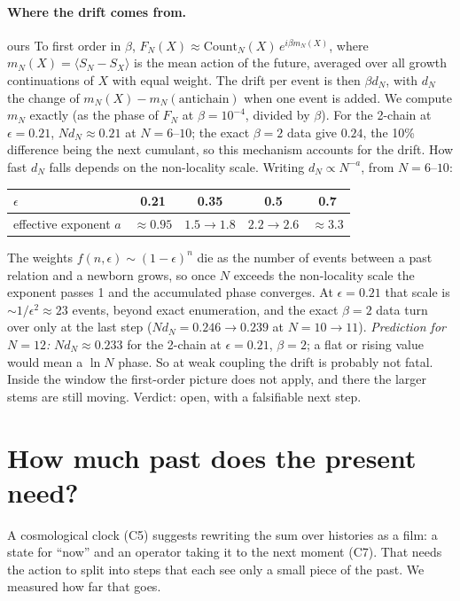 \documentclass[11pt,a4paper]{article}
\newcommand{\tagbox}[2]{\textsf{\scriptsize\colorbox{#1!12}{\textcolor{#1!70!black}{#2}}}}
\newcommand{\ours}{\tagbox{orange}{ours}}
\begin{document}
\paragraph{Where the drift comes from.} \ours{} To first order in $\beta$, $F_N(X)\approx\mathrm{Count}_N(X)\,e^{i\beta m_N(X)}$, where $m_N(X)=\langle S_N-S_X\rangle$ is the mean action of the future, averaged over all growth continuations of $X$ with equal weight. The drift per event is then $\beta d_N$, with $d_N$ the change of $m_N(X)-m_N(\text{antichain})$ when one event is added. We compute $m_N$ exactly (as the phase of $F_N$ at $\beta=10^{-4}$, divided by $\beta$). For the 2-chain at $\epsilon=0.21$, $N d_N\approx0.21$ at $N=6$--$10$; the exact $\beta=2$ data give $0.24$, the 10\% difference being the next cumulant, so this mechanism accounts for the drift. How fast $d_N$ falls depends on the non-locality scale. Writing $d_N\propto N^{-a}$, from $N=6$--$10$:
\begin{center}\small
\begin{tabular}{@{}lcccc@{}}
\toprule
$\epsilon$ & 0.21 & 0.35 & 0.5 & 0.7\\
\midrule
effective exponent $a$ & $\approx0.95$ & $1.5\to1.8$ & $2.2\to2.6$ & $\approx3.3$\\
\bottomrule
\end{tabular}
\end{center}
The weights $f(n,\epsilon)\sim(1-\epsilon)^n$ die as the number of events between a past relation and a newborn grows, so once $N$ exceeds the non-locality scale the exponent passes 1 and the accumulated phase converges. At $\epsilon=0.21$ that scale is $\sim1/\epsilon^2\approx23$ events, beyond exact enumeration, and the exact $\beta=2$ data turn over only at the last step ($N d_N=0.246\to0.239$ at $N=10\to11$). \emph{Prediction for $N=12$:} $N d_N\approx0.233$ for the 2-chain at $\epsilon=0.21$, $\beta=2$; a flat or rising value would mean a $\ln N$ phase. So at weak coupling the drift is probably not fatal. Inside the window the first-order picture does not apply, and there the larger stems are still moving. Verdict: open, with a falsifiable next step.

\section{How much past does the present need?}\label{sec:film}
A cosmological clock (C5) suggests rewriting the sum over histories as a film: a state for ``now'' and an operator taking it to the next moment (C7). That needs the action to split into steps that each see only a small piece of the past. We measured how far that goes.
\end{document}
